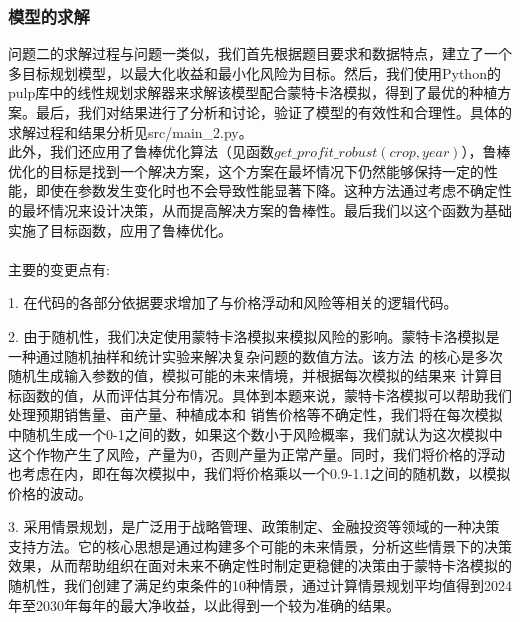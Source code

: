 \documentclass[withoutpreface]{cumcmthesis}
\begin{document}
\subsubsection{模型的求解}
问题二的求解过程与问题一类似，我们首先根据题目要求和数据特点，建立了一个多目标规划模型，以最大化收益和最小化风险为目标。然后，我们使用Python的pulp库中的线性规划求解器来求解该模型配合蒙特卡洛模拟，得到了最优的种植方案。最后，我们对结果进行了分析和讨论，验证了模型的有效性和合理性。具体的求解过程和结果分析见src/main\_2.py。\\

此外，我们还应用了鲁棒优化算法（见函数$ get\_profit\_robust(crop, year) $），鲁棒优化的目标是找到一个解决方案，这个方案在最坏情况下仍然能够保持一定的性能，即使在参数发生变化时也不会导致性能显著下降。这种方法通过考虑不确定性的最坏情况来设计决策，从而提高解决方案的鲁棒性。最后我们以这个函数为基础实施了目标函数，应用了鲁棒优化。\\\\
主要的变更点有:

1. 在代码的各部分依据要求增加了与价格浮动和风险等相关的逻辑代码。

2. 由于随机性，我们决定使用蒙特卡洛模拟来模拟风险的影响。蒙特卡洛模拟是一种通过随机抽样和统计实验来解决复杂问题的数值方法。该方法 的核心是多次随机生成输入参数的值，模拟可能的未来情境，并根据每次模拟的结果来 计算目标函数的值，从而评估其分布情况。具体到本题来说，蒙特卡洛模拟可以帮助我们处理预期销售量、亩产量、种植成本和 销售价格等不确定性，我们将在每次模拟中随机生成一个0-1之间的数，如果这个数小于风险概率，我们就认为这次模拟中这个作物产生了风险，产量为0，否则产量为正常产量。同时，我们将价格的浮动也考虑在内，即在每次模拟中，我们将价格乘以一个0.9-1.1之间的随机数，以模拟价格的波动。

3. 采用情景规划，是广泛用于战略管理、政策制定、金融投资等领域\cite{ref6}的一种决策支持方法。它的核心思想是通过构建多个可能的未来情景，分析这些情景下的决策效果，从而帮助组织在面对未来不确定性时制定更稳健的决策\cite{ref7}由于蒙特卡洛模拟的随机性，我们创建了满足约束条件的10种情景，通过计算情景规划平均值得到2024年至2030年每年的最大净收益，以此得到一个较为准确的结果。
\end{document}

